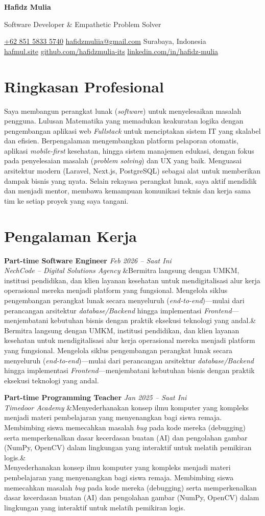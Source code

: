 \documentclass[a4paper,11pt]{article}
\newcommand{\cvname}[1]{%
  {\centering\LARGE\bfseries #1\par\vspace{2pt}}%
}
\newcommand{\cvtitle}[1]{%
  {\centering\large\color{accent} #1\par\vspace{4pt}}%
}
\newcommand{\cvcontact}[1]{%
  {\centering\small #1\par\vspace{6pt}}%
}
\newcommand{\cventry}[4]{%
  \noindent\textbf{#1} \hfill \textit{#3} \\
  \textit{#2}
  \ifx&#4& \else \\ \small #4 \fi
  \vspace{6pt}
}
\begin{document}
\cvname{Hafidz Mulia}
\cvtitle{Software Developer \& Empathetic Problem Solver}
\cvcontact{%
  \href{tel:+6285158335740}{+62 851 5833 5740} \quad\textbar\quad
  \href{mailto:hafidzmuliia@gmail.com}{hafidzmuliia@gmail.com} \quad\textbar\quad
  Surabaya, Indonesia \\
  \href{https://hafmul.site}{hafmul.site} \quad\textbar\quad
  \href{https://github.com/hafidzmulia-its}{github.com/hafidzmulia-its} \quad\textbar\quad
  \href{https://www.linkedin.com/in/hafidz-mulia/}{linkedin.com/in/hafidz-mulia}
}

\section{Ringkasan Profesional}
Saya membangun perangkat lunak (\textit{software}) untuk menyelesaikan masalah pengguna. Lulusan Matematika yang memadukan keakuratan logika dengan pengembangan aplikasi web \textit{Fullstack} untuk menciptakan sistem IT yang skalabel dan efisien. Berpengalaman mengembangkan platform pelaporan otomatis, aplikasi \textit{mobile-first} kesehatan, hingga sistem manajemen edukasi, dengan fokus pada penyelesaian masalah (\textit{problem solving}) dan UX yang baik. Menguasai arsitektur modern (Laravel, Next.js, PostgreSQL) sebagai alat untuk memberikan dampak bisnis yang nyata. Selain rekayasa perangkat lunak, saya aktif mendidik dan menjadi mentor, membawa kemampuan komunikasi teknis dan kerja sama tim ke setiap proyek yang saya tangani.

\section{Pengalaman Kerja}

\cventry
  {Part-time Software Engineer}
  {NechCode -- Digital Solutions Agency}
  {Feb 2026 -- Saat Ini}
  {Bermitra langsung dengan UMKM, institusi pendidikan, dan klien layanan kesehatan untuk mendigitalisasi alur kerja operasional mereka menjadi platform yang fungsional. Mengelola siklus pengembangan perangkat lunak secara menyeluruh (\textit{end-to-end})---mulai dari perancangan arsitektur \textit{database/Backend} hingga implementasi \textit{Frontend}---menjembatani kebutuhan bisnis dengan praktik eksekusi teknologi yang andal.}

\cventry
  {Part-time Programming Teacher}
  {Timedoor Academy}
  {Jan 2025 -- Saat Ini}
  {Menyederhanakan konsep ilmu komputer yang kompleks menjadi materi pembelajaran yang menyenangkan bagi siswa remaja. Membimbing siswa memecahkan masalah \textit{bug} pada kode mereka (debugging) serta memperkenalkan dasar kecerdasan buatan (AI) dan pengolahan gambar (NumPy, OpenCV) dalam lingkungan yang interaktif untuk melatih pemikiran logis.}
\end{document}
